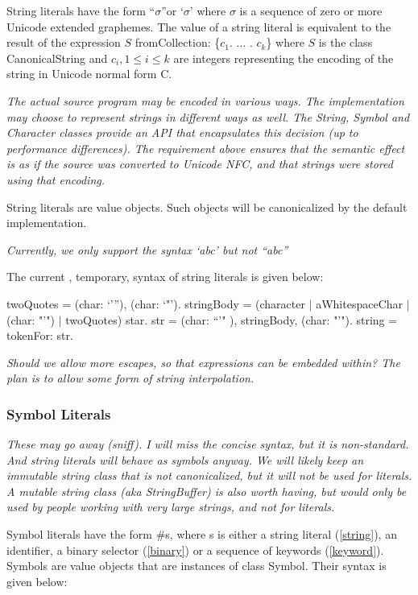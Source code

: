 \documentclass{article}
\newcommand{\code}[1]{{\sf #1}}
\begin{document}
String literals have the form \code{``$\sigma$''}or \code{`$\sigma$'} where $\sigma$ is a sequence of zero or more Unicode extended graphemes. The value of a string literal is equivalent to the result of the expression  \code{$S$ fromCollection: \{$c_1$.  $\ldots$ . $c_k$\}} where $S$ is the class \code{CanonicalString} and $c_i, 1 \le i \le k$ are integers representing the encoding of the string in Unicode normal form C.   

{\it 
The actual source program may be encoded in various ways. The implementation may choose to represent strings in different ways as well. The \code{String}, \code{Symbol} and \code{Character} classes provide an API that encapsulates this decision (up to performance differences). The requirement above ensures that the semantic effect is as if the source was converted to Unicode NFC, and that strings were stored using that encoding.
}

String literals are value objects. Such objects will be canonicalized by the default implementation.

{\it Currently, we only support  the syntax \code{`abc'} but not \code{``abc''}}

The current , temporary, syntax of string literals is given below:
\begin{newspeak}
twoQuotes =  (char: `'''),  (char: `"').     
stringBody = (character $|$ aWhitespaceChar $|$ (char: "'") $|$ twoQuotes) star.
str = (char: ``'" ),  stringBody,  (char: "'").
string = tokenFor: str.
\end{newspeak}

{\it 
Should we allow more escapes, so that expressions can be embedded within? The plan is to allow some form of string interpolation.

}



\subsubsection{ Symbol Literals}
\label{symbol}
{\it These may  go away (sniff). I will miss the concise syntax, but it is non-standard. And string literals will behave as symbols anyway. We will likely keep an immutable string class that is not canonicalized, but it will not be used for literals. A mutable string class (aka StringBuffer) is also  worth having, but would only be used by people working with very large strings, and not for literals.

}
Symbol literals have the form \code{\#s}, where \code{s} is either a string literal (\ref{string}), an identifier, a binary selector (\ref{binary}) or a sequence of keywords (\ref{keyword}). Symbols are value objects that are instances of class \code{Symbol}. Their syntax is given below:
\end{document}
